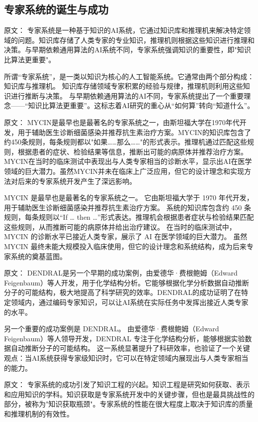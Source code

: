 \subsection{专家系统的诞生与成功}

原文：
专家系统是一种基于知识的AI系统，它通过知识库和推理机来解决特定领域的问题。知识库存储了人类专家的专业知识，推理机则根据这些知识进行推理和决策。与早期依赖通用算法的AI系统不同，专家系统强调知识的重要性，即"知识比算法更重要"。

所谓“专家系统”，是一类以知识为核心的人工智能系统。它通常由两个部分构成：知识库与推理机。  
知识库存储领域专家积累的经验与规律，推理机则利用这些知识进行推断与决策。  
与早期依赖通用算法的AI不同，专家系统提出了一个重要理念——“知识比算法更重要”。这标志着AI研究的重心从“如何算”转向“知道什么”。

原文：
MYCIN是最早也是最著名的专家系统之一，由斯坦福大学在1970年代开发，用于辅助医生诊断细菌感染并推荐抗生素治疗方案。MYCIN的知识库包含了约450条规则，每条规则都以"如果……那么……"的形式表示。推理机通过匹配这些规则，根据患者的症状、检验结果等信息，推断出可能的病原体并推荐治疗方案。MYCIN在当时的临床测试中表现出与人类专家相当的诊断水平，显示出AI在医学领域的巨大潜力。虽然MYCIN并未在临床上广泛应用，但它的设计理念和实现方法对后来的专家系统开发产生了深远影响。

MYCIN 是最早也是最著名的专家系统之一。  
它由斯坦福大学于 1970 年代开发，用于辅助医生诊断细菌感染并推荐抗生素治疗方案。  
系统的知识库包含约 450 条规则，每条规则以“If … then …”形式表达。推理机会根据患者症状与检验结果匹配这些规则，从而推断可能的病原体并给出治疗建议。  
在当时的临床测试中，MYCIN 的诊断水平已接近人类专家，展示了 AI 在医学领域的巨大潜力。  
虽然 MYCIN 最终未能大规模投入临床使用，但它的设计理念和系统结构，成为后来专家系统的奠基蓝图。

原文：
DENDRAL是另一个早期的成功案例，由爱德华·费根鲍姆（Edward Feigenbaum）等人开发，用于化学结构分析。它能够根据化学分析数据自动推断分子的可能结构，极大地提高了科学研究的效率。DENDRAL的成功证明了在特定领域内，通过编码专家知识，可以让AI系统在实际任务中发挥出接近人类专家的水平。

另一个重要的成功案例是 DENDRAL。  
由爱德华·费根鲍姆（Edward Feigenbaum）等人领导开发，DENDRAL 专注于化学结构分析，能够根据实验数据自动推断分子的可能结构。  
这一系统显著提升了科研效率，也验证了一个关键观点：当AI系统获得专家级知识时，它可以在特定领域内展现出与人类专家相当的能力。

原文：
专家系统的成功引发了知识工程的兴起。知识工程是研究如何获取、表示和应用知识的学科。知识获取是专家系统开发中的关键步骤，但也是最具挑战性的部分，被称为"知识获取瓶颈"。专家系统的性能在很大程度上取决于知识库的质量和推理机制的有效性。

